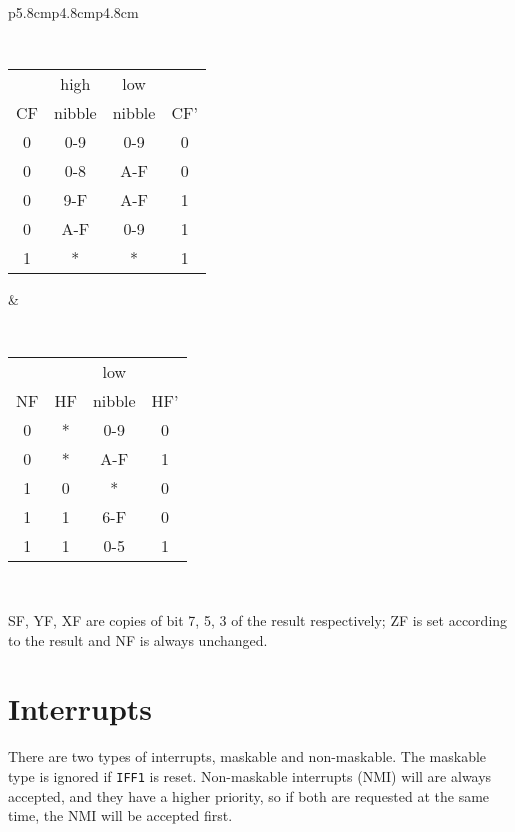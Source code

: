{\begin{tabular}{p{5.8cm}p{4.8cm}p{4.8cm}}
		{\tt
			\begin{tabular}[t]{c|c|c|c}
				   & high   & low    & \\
				CF & nibble & nibble & CF' \\ 	
				\hline
				0 & 0-9    & 0-9    &  0  \\
				0 & 0-8    & A-F    &  0  \\
				0 & 9-F    & A-F    &  1  \\
				0 & A-F    & 0-9    &  1  \\
				1 &  *     &  *     &  1  \\ 
				\hline
			\end{tabular}
		}

		&
		
		{\tt
			\begin{tabular}[t]{c|c|c|c}
				   &    & low    & \\
				NF & HF & nibble & HF' \\ 
				\hline
				0 &  * & 0-9    &  0  \\
				0 &  * & A-F    &  1  \\
				1 &  0 &  *     &  0  \\
				1 &  1 & 6-F    &  0  \\
				1 &  1 & 0-5    &  1  \\ 
				\hline
			\end{tabular}
		}
		
		\\

	\end{tabular}
}

SF, YF, XF are copies of bit 7, 5, 3 of the result respectively; ZF is set according to the result and NF is always unchanged.


\section{Interrupts}
\label{interrupts}

There are two types of interrupts, maskable and non-maskable. The maskable type is ignored if {\tt IFF1} is reset. Non-maskable interrupts (NMI) will are always accepted, and they have a higher priority, so if both are requested at the same time, the NMI will be accepted first.

